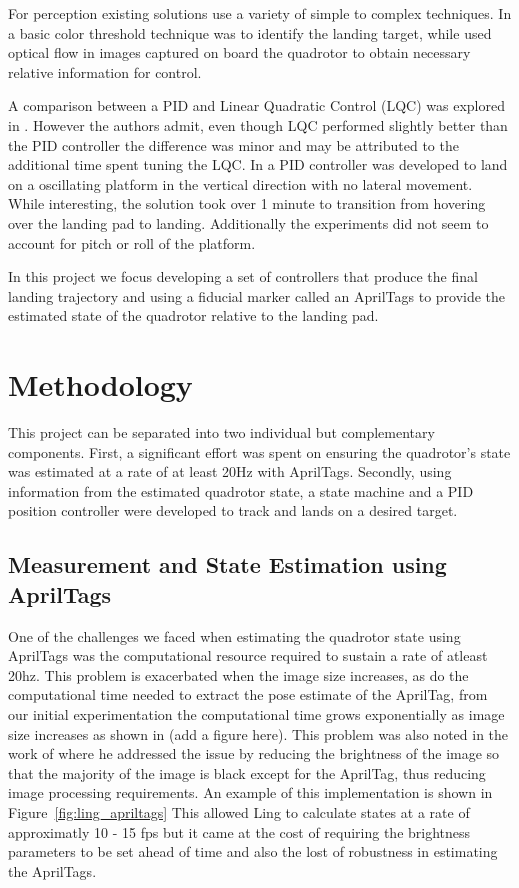 \documentclass[11pt, twocolumn]{article}
\begin{document}
For perception existing solutions use a variety of simple to complex techniques. In \cite{Kim2014} a basic color threshold technique was to identify the landing target, while \cite{Herisse2012} used optical flow in images captured on board the quadrotor to obtain necessary relative information for control. 

A comparison between a PID and Linear Quadratic Control (LQC) was explored in \cite{Friis2009}. However the authors admit, even though LQC performed slightly better than the PID controller the difference was minor and may be attributed to the additional time spent tuning the LQC. In \cite{Herisse2012} a PID controller was developed to land on a oscillating platform in the vertical direction with no lateral movement. While interesting, the solution took over 1 minute to transition from hovering over the landing pad to landing. Additionally the experiments did not seem to account for pitch or roll of the platform. 

In this project we focus developing a set of controllers that produce the final landing trajectory and using a fiducial marker called an AprilTags \cite{apriltags} to provide the estimated state of the quadrotor relative to the landing pad. 

\section{Methodology}
This project can be separated into two individual but complementary components. First, a significant effort was spent on ensuring the quadrotor's state was estimated at a rate of at least 20Hz with AprilTags. Secondly, using information from the estimated quadrotor state, a state machine and a PID position controller were developed to track and lands on a desired target.

\subsection{Measurement and State Estimation using AprilTags}
\label{subsec:AprilTag}
One of the challenges we faced when estimating the quadrotor state using AprilTags was the computational resource required to sustain a rate of atleast 20hz. This problem is exacerbated when the image size increases, as do the computational time needed to extract the pose estimate of the AprilTag, from our initial experimentation the computational time grows exponentially as image size increases as shown in (add a figure here). This problem was also noted in the work of \cite{Ling2014} where he addressed the issue by reducing the brightness of the image so that the majority of the image is black except for the AprilTag, thus reducing image processing requirements. An example of this implementation is shown in Figure~\ref{fig:ling_apriltags} This allowed Ling \cite{Lee2012} to calculate states at a rate of approximatly 10 - 15 fps but it came at the cost of requiring the brightness parameters to be set ahead of time and also the lost of robustness in estimating the AprilTags.
\end{document}
